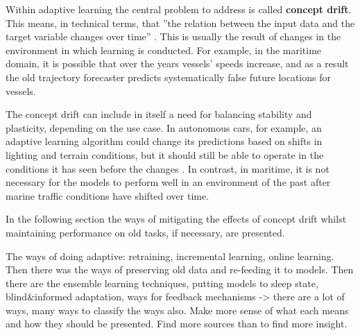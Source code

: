 Within adaptive learning the central problem to address is called \textbf{concept drift}. This means, in technical terms, that ''the relation between the input data and the target variable changes over time'' \cite{conceptdriftsurvey}. This is usually the result of changes in the environment in which learning is conducted. For example, in the maritime domain, it is possible that over the years vessels' speeds increase, and as a result the old trajectory forecaster predicts systematically false future locations for vessels.

The concept drift can include in itself a need for balancing stability and plasticity, depending on the use case. In autonomous cars, for example, an adaptive learning algorithm could change its predictions based on shifts in lighting and terrain conditions, but it should still be able to operate in the conditions it has seen before the changes \cite{conceptdriftsurvey}. In contrast, in maritime, it is not necessary for the models to perform well in an environment of the past after marine traffic conditions have shifted over time.




In the following section the ways of mitigating the effects of concept drift whilst maintaining performance on old tasks, if necessary, are presented.

The ways of doing adaptive: retraining, incremental learning, online learning. Then there was the ways of preserving old data and re-feeding it to models. Then there are the ensemble learning techniques, putting models to sleep state, blind&informed adaptation, ways for feedback mechanisms
-> there are a lot of ways, many ways to classify the ways also. Make more sense of what each means and how they should be presented. Find more sources than \cite{conceptdriftsurvey} to find more insight.

